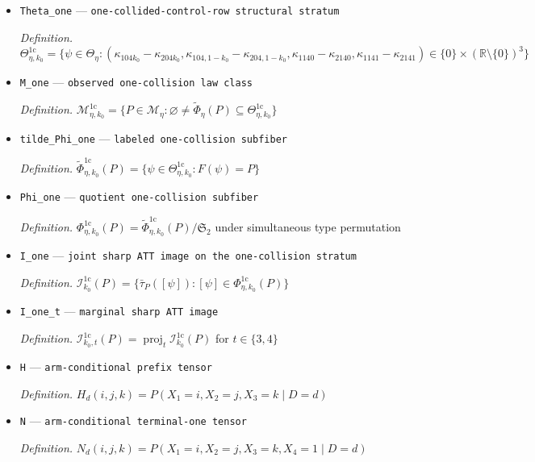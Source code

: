 \documentclass{article}
\begin{document}
\begin{itemize}
  \item \texttt{Theta\_\allowbreak{}one} --- \texttt{one-\allowbreak{}collided-\allowbreak{}control-\allowbreak{}row structural stratum}
  \par\smallskip\noindent\emph{Definition.} \(\Theta_{\eta,k_0}^{1\mathrm c}=\{\psi\in\Theta_\eta:(\kappa_{104k_0}-\kappa_{204k_0},\kappa_{104,1-k_0}-\kappa_{204,1-k_0},\kappa_{1140}-\kappa_{2140},\kappa_{1141}-\kappa_{2141})\in\{0\}\times(\mathbb R\setminus\{0\})^3\}\)
  \item \texttt{M\_\allowbreak{}one} --- \texttt{observed one-\allowbreak{}collision law class}
  \par\smallskip\noindent\emph{Definition.} \(\mathcal M_{\eta,k_0}^{1\mathrm c}=\{P\in\mathcal M_\eta:\varnothing\ne\widetilde\Phi_\eta(P)\subseteq\Theta_{\eta,k_0}^{1\mathrm c}\}\)
  \item \texttt{tilde\_\allowbreak{}Phi\_\allowbreak{}one} --- \texttt{labeled one-\allowbreak{}collision subfiber}
  \par\smallskip\noindent\emph{Definition.} \(\widetilde\Phi_{\eta,k_0}^{1\mathrm c}(P)=\{\psi\in\Theta_{\eta,k_0}^{1\mathrm c}:F(\psi)=P\}\)
  \item \texttt{Phi\_\allowbreak{}one} --- \texttt{quotient one-\allowbreak{}collision subfiber}
  \par\smallskip\noindent\emph{Definition.} \(\Phi_{\eta,k_0}^{1\mathrm c}(P)=\widetilde\Phi_{\eta,k_0}^{1\mathrm c}(P)/\mathfrak S_2\) under simultaneous type permutation
  \item \texttt{I\_\allowbreak{}one} --- \texttt{joint sharp ATT image on the one-\allowbreak{}collision stratum}
  \par\smallskip\noindent\emph{Definition.} \(\mathcal I_{k_0}^{1\mathrm c}(P)=\{\bar\tau_P([\psi]):[\psi]\in\Phi_{\eta,k_0}^{1\mathrm c}(P)\}\)
  \item \texttt{I\_\allowbreak{}one\_\allowbreak{}t} --- \texttt{marginal sharp ATT image}
  \par\smallskip\noindent\emph{Definition.} \(\mathcal I_{k_0,t}^{1\mathrm c}(P)=\operatorname{proj}_t\mathcal I_{k_0}^{1\mathrm c}(P)\) for \(t\in\{3,4\}\)
  \item \texttt{H} --- \texttt{arm-\allowbreak{}conditional prefix tensor}
  \par\smallskip\noindent\emph{Definition.} \(H_d(i,j,k)=P(X_1=i,X_2=j,X_3=k\mid D=d)\)
  \item \texttt{N} --- \texttt{arm-\allowbreak{}conditional terminal-\allowbreak{}one tensor}
  \par\smallskip\noindent\emph{Definition.} \(N_d(i,j,k)=P(X_1=i,X_2=j,X_3=k,X_4=1\mid D=d)\)

\end{itemize}
\end{document}
